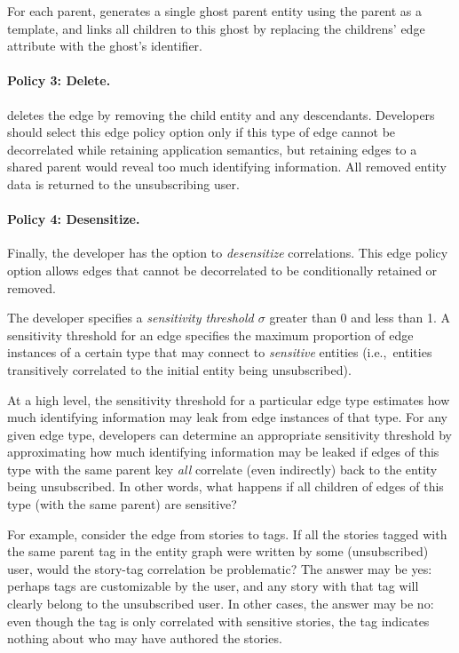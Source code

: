 For each parent, \sys generates a single ghost parent entity using the parent as a template, and
links all children to this ghost by replacing the childrens' edge attribute with the ghost's
identifier.

\paragraph{Policy 3: Delete.}
\sys deletes the edge by removing the child entity and any descendants.  Developers should select
this edge policy option only if this type of edge cannot be decorrelated while retaining application
semantics, but retaining edges to a shared parent would reveal too much identifying information.
All removed entity data is returned to the unsubscribing user.

\paragraph{Policy 4: Desensitize.}
Finally, the developer has the option to \emph{desensitize} correlations. This edge policy option
allows edges that cannot be decorrelated to be conditionally retained or removed.

The developer specifies a \emph{sensitivity threshold $\sigma$} greater than 0 and less than 1.  A
sensitivity threshold for an edge specifies the maximum proportion of edge instances of a certain
type that may connect to \emph{sensitive} entities (i.e.,\ entities transitively correlated to the
initial entity being unsubscribed). 

At a high level, the sensitivity threshold for a particular edge type estimates how much identifying
information may leak from edge instances of that type.  For any given edge type, developers can
determine an appropriate sensitivity threshold by approximating how much identifying information may
be leaked if edges of this type with the same parent key \emph{all} correlate (even indirectly) back
to the entity being unsubscribed. In other words, what happens if all children of edges of this type
(with the same parent) are sensitive?

For example, consider the edge from stories to tags. If all the stories tagged with the same parent
tag in the entity graph were written by some (unsubscribed) user, would the story-tag correlation be
problematic? The answer may be yes: perhaps tags are customizable by the user, and any story with
that tag will clearly belong to the unsubscribed user. In other cases, the answer may be no: even
though the tag is only correlated with sensitive stories, the tag indicates nothing about who may
have authored the stories.

